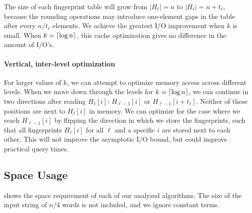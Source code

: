 \documentclass[a4]{article}
\newcommand*{\pref}{\prettyref}
\begin{document}
The size of each fingerprint table will grow from $|H_\ell| = n$ to $|H_\ell| = n+t_\ell$, because the rounding operations may introduce one-element gaps in the table after every $n/t_\ell$ elements. We achieve the greatest I/O improvement when $k$ is small. When $k=\lceil\log n\rceil$, this cache optimization gives no difference in the amount of I/O's.

\paragraph{Vertical, inter-level optimization}

For larger values of $k$, we can attempt to optimize memory access across different levels. When we move down through the levels for $k=\lceil\log n\rceil$, we can continue in two directions after reading $H_\ell[i]$: $H_{\ell-1}[i]$ or $H_{\ell-1}[i+t_\ell]$. Neither of these positions are next to $H_\ell[i]$ in memory. We can optimize for the case where we reach $H_{\ell-1}[i]$ by flipping the direction in which we store the fingerprints, such that all fingerprints $H_\ell[i]$ for all $\ell$ and a specific $i$ are stored next to each other. This will not improve the asymptotic I/O bound, but could improve practical query times.

\subsection{Space Usage}

\pref{tab:algorithms-space} shows the space requirement of each of our analyzed algorithms. The size of the input string of $n/4$ words is not included, and we ignore constant terms.
\end{document}
